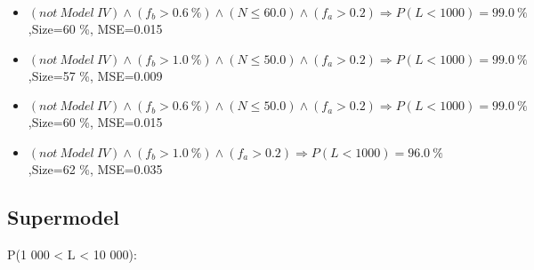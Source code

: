 \documentclass[numbered]{CSL}
\begin{document}
\begin{itemize}
\item $(not~Model~IV) \land (f_b > 0.6~\%) \land (N \leq 60.0) \land (f_a > 0.2) \Rightarrow P(L < 1 000) = 99.0~\%$,\hfill Size=60 \%, MSE=0.015
\item $(not~Model~IV) \land (f_b > 1.0~\%) \land (N \leq 50.0) \land (f_a > 0.2) \Rightarrow P(L < 1 000) = 99.0~\%$,\hfill Size=57 \%, MSE=0.009
\item $(not~Model~IV) \land (f_b > 0.6~\%) \land (N \leq 50.0) \land (f_a > 0.2) \Rightarrow P(L < 1 000) = 99.0~\%$,\hfill Size=60 \%, MSE=0.015
\item $(not~Model~IV) \land (f_b > 1.0~\%) \land (f_a > 0.2) \Rightarrow P(L < 1 000) = 96.0~\%$,\hfill Size=62 \%, MSE=0.035
\end{itemize}

\subsection{Supermodel}
P(1 000 < L < 10 000):
\end{document}
